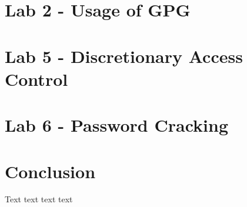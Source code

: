 \documentclass[12pt]{report}
\begin{document}
    \chapter{Lab 2 - Usage of GPG}\label{ch:lab2}
    

    \chapter{Lab 5 - Discretionary Access Control}\label{ch:lab5}
    

    \chapter{Lab 6 - Password Cracking}\label{ch:lab6n}
    

    \chapter*{Conclusion}\label{ch:conclusion}

    Text text text text
\end{document}
